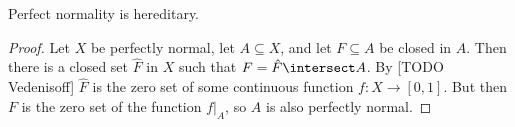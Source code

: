 \documentclass[article, a4paper, 11pt, oneside]{memoir}
\numberwithin{equation}{chapter}
\begin{document}
\begin{corollary}
    \label{cor:perfect-normality-hereditary}
    Perfect normality is hereditary.
\end{corollary}

\begin{proof}
    Let $X$ be perfectly normal, let $A \subseteq X$, and let $F \subseteq A$ be closed in $A$. Then there is a closed set $\hat{F}$ in $X$ such that $F = \hat{F} \intersect A$. By [TODO Vedenisoff] $\hat{F}$ is the zero set of some continuous function $f \colon X \to [0,1]$. But then $F$ is the zero set of the function $f|_A$, so $A$ is also perfectly normal.
\end{proof}
    

\nocite{*}

\printbibliography
\end{document}
